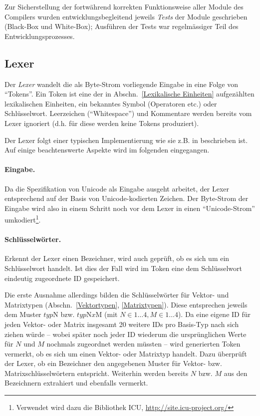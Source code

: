 \documentclass[twoside,a4paper,fleqn,12pt]{article}
\begin{document}
Zur Sicherstellung der fortwährend korrekten Funktionsweise aller Module des Compilers wurden entwicklungsbegleitend 
jeweils \emph{Tests} der Module geschrieben (Black-Box und White-Box); Ausführen der Tests war regelmässiger Teil des Entwicklungsprozesses.
 
\subsection{Lexer}

Der \emph{Lexer} wandelt die als Byte-Strom vorliegende Eingabe in eine Folge von "`Tokens"'.
Ein Token ist eine der in Abschn.~\ref{Lexikalische Einheiten} aufgezählten lexikalischen Einheiten, ein bekanntes Symbol (Operatoren etc.) oder Schlüsselwort. 
Leerzeichen (``Whitespace'') und Kommentare werden bereits vom Lexer ignoriert (d.h. für diese werden keine Tokens produziert).

Der Lexer folgt einer typischen Implementierung wie sie z.B. in \cite{wirth_compiler} beschrieben ist. Auf einige beachtenswerte Aspekte
wird im folgenden eingegangen.

\paragraph{Eingabe.} Da die Spezifikation von Unicode als Eingabe ausgeht arbeitet, der Lexer entsprechend auf der Basis von Unicode-kodierten Zeichen.
Der Byte-Strom der Eingabe wird also in einem Schritt noch vor dem Lexer in einen "`Unicode-Strom"' umkodiert\footnote{Verwendet wird dazu die Bibliothek ICU,
\url{http://site.icu-project.org/}}.

\paragraph{Schlüsselwörter.} Erkennt der Lexer einen Bezeichner, wird auch geprüft, ob es sich um ein Schlüsselwort handelt. Ist dies der Fall
wird im Token eine dem Schlüsselwort eindeutig zugeordnete ID gespeichert.

Die erste Ausnahme allerdings bilden die Schlüsselwörter für Vektor- und Matrixtypen (Abschn.~\ref{Vektortypen}, \ref{Matrixtypen}). Diese entsprechen
jeweils dem Muster $\mathit{typ}\mathrm{N}$ bzw. $\mathit{typ}\mathrm{N}\mathit{x}\mathrm{M}$ (mit $N \in 1 \dots 4, M \in 1 \dots 4$).
Da eine eigene ID für jeden Vektor- oder Matrix insgesamt 20 weitere IDs pro Basis-Typ nach sich ziehen würde -- wobei später noch jeder ID wiederum
die ursprünglichen Werte für $N$ und $M$ nochmals zugeordnet
werden müssten -- wird generierten Token vermerkt, ob es sich um einen Vektor- oder Matrixtyp handelt.
Dazu überprüft der Lexer, ob ein Bezeichner den angegebenen Muster für Vektor- bzw. Matrixschlüsselwörtern entspricht.
Weiterhin werden bereits $N$ bzw. $M$ aus den Bezeichnern extrahiert und ebenfalls vermerkt.
\end{document}
